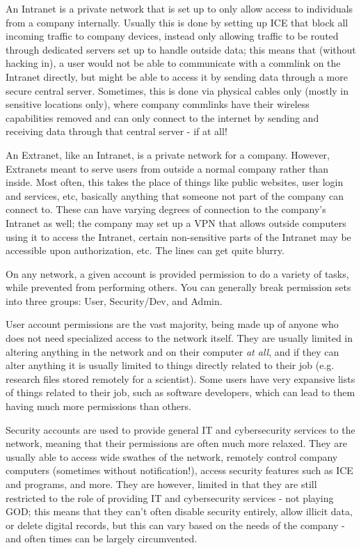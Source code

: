 \begin{multicols}{3}
	An Intranet is a private network that is set up to only allow access to individuals from a company internally. Usually this is done by setting up ICE that block all incoming traffic to company devices, instead only allowing traffic to be routed through dedicated servers set up to handle outside data; this means that (without hacking in), a user would not be able to communicate with a commlink on the Intranet directly, but might be able to access it by sending data through a more secure central server. Sometimes, this is done via physical cables only (mostly in sensitive locations only), where company commlinks have their wireless capabilities removed and can only connect to the internet by sending and receiving data through that central server - if at all!
	
	An Extranet, like an Intranet, is a private network for a company. However, Extranets meant to serve users from outside a normal company rather than inside. Most often, this takes the place of things like public websites, user login and services, etc, basically anything that someone not part of the company can connect to. These can have varying degrees of connection to the company's Intranet as well; the company may set up a VPN that allows outside computers using it to access the Intranet, certain non-sensitive parts of the Intranet may be accessible upon authorization, etc. The lines can get quite blurry.
	
	On any network, a given account is provided permission to do a variety of tasks, while prevented from performing others. You can generally break permission sets into three groups: User, Security/Dev, and Admin. 
	
	User account permissions are the vast majority, being made up of anyone who does not need specialized access to the network itself. They are usually limited in altering anything in the network and on their computer \textit{at all}, and if they can alter anything it is usually limited to things directly related to their job (e.g. research files stored remotely for a scientist). Some users have very expansive lists of things related to their job, such as software developers, which can lead to them having much more permissions than others. 
	
	Security accounts are used to provide general IT and cybersecurity services to the network, meaning that their permissions are often much more relaxed. They are usually able to access wide swathes of the network, remotely control company computers (sometimes without notification!), access security features such as ICE and programs, and more. They are however, limited in that they are still restricted to the role of providing IT and cybersecurity services - not playing GOD; this means that they can't often disable security entirely, allow illicit data, or delete digital records, but this can vary based on the needs of the company - and often times can be largely circumvented.
	

\end{multicols}
